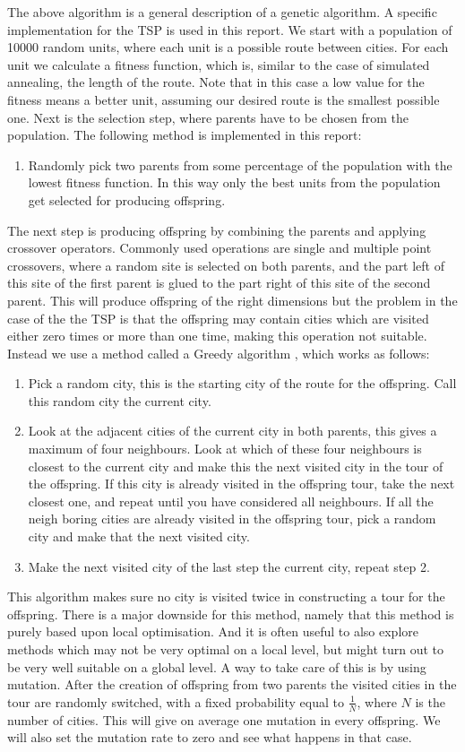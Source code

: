 \documentclass[10pt,a4paper]{article}
\begin{document}
The above algorithm is a general description of a genetic algorithm. A specific implementation for the TSP is used in this report. We start with a population of 10000 random units, where each unit is a possible route between cities. For each unit we calculate a fitness function, which is, similar to the case of simulated annealing, the length of the route. Note that in this case a low value for the fitness means a better unit, assuming our desired route is the smallest possible one. Next is the selection step, where parents have to be chosen from the population. The following method is implemented in this report:
\begin{enumerate}
\item
  Randomly pick two parents from some percentage of the population with the lowest fitness function. In this way only the best units from the population get selected for producing offspring.
\end{enumerate}
The next step is producing offspring by combining the parents and applying crossover operators. Commonly used operations are single and multiple point crossovers, where a random site is selected on both parents, and the part left of this site of the first parent is glued to the part right of this site of the second parent. This will produce offspring of the right dimensions but the problem in the case of the the TSP is that the offspring may contain cities which are visited either zero times or more than one time, making this operation not suitable. Instead we use a method called a Greedy algorithm \cite{Greedy}, which works as follows:
\begin{enumerate}
\item 
  Pick a random city, this is the starting city of the route for the offspring. Call this random city the current city.
\item
  Look at the adjacent cities of the current city in both parents, this gives a maximum of four neighbours. Look at which of these four neighbours is closest to the current city and make this the next visited city in the tour of the offspring. If this city is already visited in the offspring tour, take the next closest one, and repeat until you have considered all neighbours. If all the neigh boring cities are already visited in the offspring tour, pick a random city and make that the next visited city.
\item
  Make the next visited city of the last step the current city, repeat step 2.
\end{enumerate}
This algorithm makes sure no city is visited twice in constructing a tour for the offspring. There is a major downside for this method, namely that this method is purely based upon local optimisation. And it is often useful to also explore methods which may not be very optimal on a local level, but might turn out to be very well suitable on a global level. A way to take care of this is by using mutation. After the creation of offspring from two parents the visited cities in the tour are randomly switched, with a fixed probability equal to $\frac{1}{N}$, where $N$ is the number of cities. This will give on average one mutation in every offspring. We will also set the mutation rate to zero and see what happens in that case.\\
\end{document}

